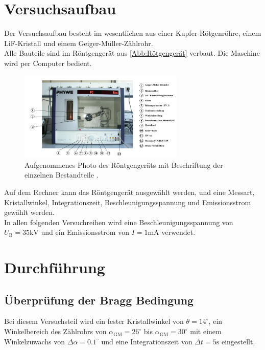 \section{Versuchsaufbau}
\label{sec:Versuchsaufbau}

Der Versuchsaufbau besteht im wesentlichen aus einer Kupfer-Rötgenröhre,
einem LiF-Kristall und einem Geiger-Müller-Zählrohr.\\
Alle Bauteile sind im Röntgengerät aus \autoref{Abb:Rötgengerät} verbaut.
Die Maschine wird per Computer bedient.

\begin{figure}
    \centering
    \includegraphics[width=0.7\textwidth]{Bilder/Röntgengerät.png}
    \caption{Aufgenommenes Photo des Röntgengeräts mit Beschriftung der einzelnen Bestandteile \cite{sample}.}
    \label{Abb:Rötgengerät}
\end{figure}

Auf dem Rechner kann das Röntgengerät ausgewählt werden, und eine Messart,
Kristallwinkel, Integrationszeit, Beschleunigungsspannung und Emissionsstrom 
gewählt werden.\\
In allen folgenden Versuchreihen wird eine Beschleunigungsspannung von 
$U_{\mathrm{B}} = 35 \si{\kilo\volt}$ und ein Emissionsstrom von $I = 1 \si{\milli\ampere}$
verwendet.\\

\section{Durchführung}
\label{sec:Durchführung}

\subsection{Überprüfung der Bragg Bedingung}

Bei diesem Versuchsteil wird ein fester Kristallwinkel
von $\theta = 14 ^\circ$, ein Winkelbereich des Zählrohrs
von $\alpha_{\mathrm{GM}} = 26 ^\circ$ bis $\alpha_{\mathrm{GM}} = 30 ^\circ$
mit einem Winkelzuwachs von $\Delta \alpha = 0.1 ^\circ$ und eine 
Integrationszeit von $\Delta t = 5 \si{\second}$ eingestellt.\\

